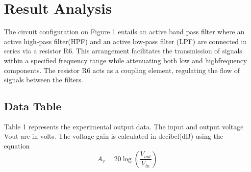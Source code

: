 \documentclass[12pt]{article}
\begin{document}
\section{Result Analysis}
The circuit configuration on Figure 1 entails an active band pass filter where an active high-pass filter(HPF) and an active low-pass filter (LPF) are connected in series via a resistor R6. This arrangement facilitates the transmission of signals within a specified frequency range while attenuating both low and highfrequency components. The resistor R6 acts as a coupling element, regulating the flow of signals between the filters.

\subsection{Data Table}

Table 1 represents the experimental output data. The input and output voltage Vout are in volts. The voltage gain is calculated in decibel(dB) using the equation
\[
    A_v = 20 \log \left( \frac{V_{out}}{V_{in}} \right)
\] 
\end{document}
